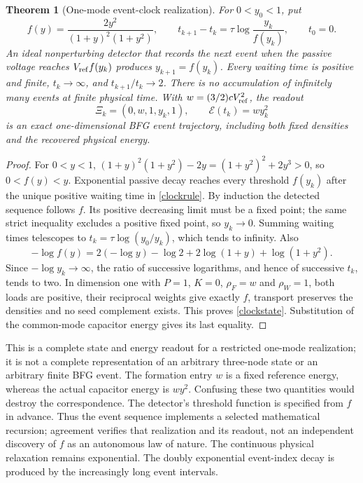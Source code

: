 \documentclass[11pt,letterpaper]{article}
\newtheorem{theorem}{Theorem}[section]
\theoremstyle{definition}
\numberwithin{equation}{section}
\begin{document}
\begin{theorem}[One-mode event-clock realization]\label{clockrealization}
For $0<y_0<1$, put
\begin{equation}\label{clockrule}
f(y)=\frac{2y^2}{(1+y)^2(1+y^2)},\qquad
 t_{k+1}-t_k=\tau\log\frac{y_k}{f(y_k)},\qquad t_0=0.
\end{equation}
An ideal nonperturbing detector that records the next event when the passive voltage reaches $V_{\rm ref}f(y_k)$ produces $y_{k+1}=f(y_k)$. Every waiting time is positive and finite, $t_k\to\infty$, and $t_{k+1}/t_k\to2$. There is no accumulation of infinitely many events at finite physical time. With $w=(3/2)cV_{\rm ref}^2$, the readout
\begin{equation}\label{clockstate}
\Xi_k=(0,w,1,y_k,1),\qquad \mathcal E(t_k)=w y_k^2
\end{equation}
is an exact one-dimensional BFG event trajectory, including both fixed densities and the recovered physical energy.
\end{theorem}
\begin{proof}
For $0<y<1$, $(1+y)^2(1+y^2)-2y=(1+y^2)^2+2y^3>0$, so $0<f(y)<y$. Exponential passive decay reaches every threshold $f(y_k)$ after the unique positive waiting time in \eqref{clockrule}. By induction the detected sequence follows $f$. Its positive decreasing limit must be a fixed point; the same strict inequality excludes a positive fixed point, so $y_k\to0$. Summing waiting times telescopes to $t_k=\tau\log(y_0/y_k)$, which tends to infinity. Also
\begin{equation}
-\log f(y)=2(-\log y)-\log2+2\log(1+y)+\log(1+y^2).
\end{equation}
Since $-\log y_k\to\infty$, the ratio of successive logarithms, and hence of successive $t_k$, tends to two. In dimension one with $P=1$, $K=0$, $\rho_F=w$ and $\rho_W=1$, both loads are positive, their reciprocal weights give exactly $f$, transport preserves the densities and no seed complement exists. This proves \eqref{clockstate}. Substitution of the common-mode capacitor energy gives its last equality.
\end{proof}
This is a complete state and energy readout for a restricted one-mode realization; it is not a complete representation of an arbitrary three-node state or an arbitrary finite BFG event. The formation entry $w$ is a fixed reference energy, whereas the actual capacitor energy is $wy^2$. Confusing these two quantities would destroy the correspondence. The detector's threshold function is specified from $f$ in advance. Thus the event sequence implements a selected mathematical recursion; agreement verifies that realization and its readout, not an independent discovery of $f$ as an autonomous law of nature. The continuous physical relaxation remains exponential. The doubly exponential event-index decay is produced by the increasingly long event intervals.
\end{document}
